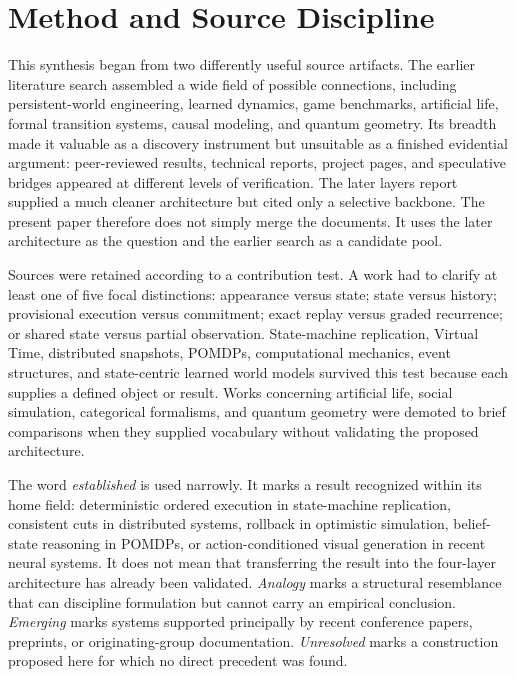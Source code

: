 \documentclass[11pt]{article}
\begin{document}
\section{Method and Source Discipline}

This synthesis began from two differently useful source artifacts. The earlier literature search assembled a wide field of possible connections, including persistent-world engineering, learned dynamics, game benchmarks, artificial life, formal transition systems, causal modeling, and quantum geometry. Its breadth made it valuable as a discovery instrument but unsuitable as a finished evidential argument: peer-reviewed results, technical reports, project pages, and speculative bridges appeared at different levels of verification. The later layers report supplied a much cleaner architecture but cited only a selective backbone. The present paper therefore does not simply merge the documents. It uses the later architecture as the question and the earlier search as a candidate pool.

Sources were retained according to a contribution test. A work had to clarify at least one of five focal distinctions: appearance versus state; state versus history; provisional execution versus commitment; exact replay versus graded recurrence; or shared state versus partial observation. State-machine replication, Virtual Time, distributed snapshots, POMDPs, computational mechanics, event structures, and state-centric learned world models survived this test because each supplies a defined object or result. Works concerning artificial life, social simulation, categorical formalisms, and quantum geometry were demoted to brief comparisons when they supplied vocabulary without validating the proposed architecture.

The word \emph{established} is used narrowly. It marks a result recognized within its home field: deterministic ordered execution in state-machine replication, consistent cuts in distributed systems, rollback in optimistic simulation, belief-state reasoning in POMDPs, or action-conditioned visual generation in recent neural systems. It does not mean that transferring the result into the four-layer architecture has already been validated. \emph{Analogy} marks a structural resemblance that can discipline formulation but cannot carry an empirical conclusion. \emph{Emerging} marks systems supported principally by recent conference papers, preprints, or originating-group documentation. \emph{Unresolved} marks a construction proposed here for which no direct precedent was found.
\end{document}
